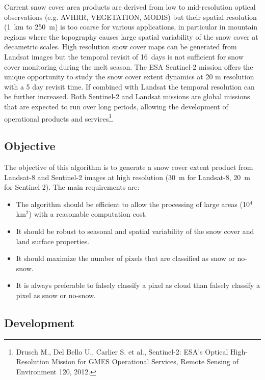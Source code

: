 \documentclass[a4paper]{article}
\begin{document}
Current snow cover area products are derived from low to mid-resolution optical observations (e.g. AVHRR, VEGETATION, MODIS) but their spatial resolution (1~km to 250~m) is too coarse for various applications, in particular in mountain regions where the topography causes large spatial variability of the snow cover at decametric scales. High resolution snow cover maps can be generated from Landsat images but the temporal revisit of 16~days is not sufficient for snow cover monitoring during the melt season. The ESA Sentinel-2 mission offers the unique opportunity to study the snow cover extent dynamics at 20 m resolution with a 5 day revisit time. If combined with Landsat the temporal resolution can be further increased. Both Sentinel-2 and Landsat missions are global missions that are expected to run over long periods, allowing the development of operational products and services\footnote{Drusch M., Del Bello U., Carlier S. et al., Sentinel-2: ESA's Optical High-Resolution Mission for GMES Operational Services, Remote Sensing of Environment 120, 2012.}.

\subsection{Objective}

The objective of this algorithm is to generate a snow cover extent product from Landsat-8 and Sentinel-2 images at high resolution (30~m for Landsat-8, 20~m for Sentinel-2). The main requirements are:
\begin{itemize}
 \item The algorithm should be efficient to allow the processing of large areas (10$^4$ km$^2$) with a reasonable computation cost. 
 \item It should be robust to seasonal and spatial variability of the snow cover and land surface properties. 
 \item It should maximize the number of pixels that are classified as snow or no-snow.
 \item It is always preferable to falsely classify a pixel as cloud than falsely classify a pixel as snow or no-snow. 
\end{itemize}

\subsection{Development}
\end{document}
